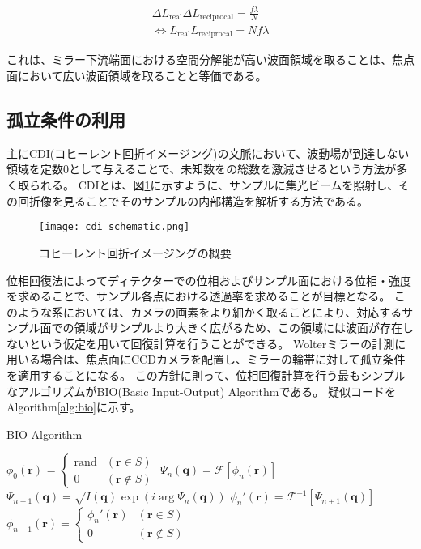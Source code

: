 \begin{eqnarray}
  \Delta L_{\mathrm{real}} \Delta L_{\mathrm{reciprocal}} = \frac{f  \lambda}{N} \label{eqn:sampling_theorem_px} \\
  \Leftrightarrow 
  L_{\mathrm{real}} L_{\mathrm{reciprocal}} = N f \lambda \label{eqn:sampling_theorem_size}
\end{eqnarray}

これは、ミラー下流端面における空間分解能が高い波面領域を取ることは、焦点面において広い波面領域を取ることと等価である。

\clearpage
\newpage

\subsection{孤立条件の利用}
\label{chap3_solitude_introduction}
主にCDI(コヒーレント回折イメージング)の文脈において、波動場が到達しない領域を定数0として与えることで、未知数をの総数を激減させるという方法が多く取られる。
CDIとは、図\ref{fig:cdi_schematic}に示すように、サンプルに集光ビームを照射し、その回折像を見ることでそのサンプルの内部構造を解析する方法である。

\begin{figure}[!ht]
\centering
\texttt{[image: cdi\_schematic.png]}
\caption{コヒーレント回折イメージングの概要}
\label{fig:cdi_schematic}
\end{figure}

位相回復法によってディテクターでの位相およびサンプル面における位相・強度を求めることで、サンプル各点における透過率を求めることが目標となる。
このような系においては、カメラの画素をより細かく取ることにより、対応するサンプル面での領域がサンプルより大きく広がるため、この領域には波面が存在しないという仮定を用いて回復計算を行うことができる。
Wolterミラーの計測に用いる場合は、焦点面にCCDカメラを配置し、ミラーの輪帯に対して孤立条件を適用することになる。
この方針に則って、位相回復計算を行う最もシンプルなアルゴリズムがBIO(Basic Input-Output) Algorithmである。
疑似コードをAlgorithm\ref{alg:bio}に示す。

\newcommand{\pos} {
    \mathbf{r}
}
\newcommand{\rpos} {
    \mathbf{q}
}

\begin{algorithm}                      
\caption{BIO Algorithm}         
\label{alg:bio}                          
\begin{algorithmic}
    \STATE $\phi_0(\pos)$
      = $\begin{cases}
        \mathrm{rand} & (\pos \in S) \\
        0 & (\pos \notin S)
      \end{cases}$
    \STATE $\Psi_n(\rpos) = \mathcal F [\phi_n(\pos)]$
    \STATE $\Psi_{n+1}(\rpos) = \sqrt{I(\rpos)} \exp \left( i \arg \Psi_n(\rpos) \right)$ 
    \STATE $\phi_n'(\pos) = \mathcal F^{-1} [\Psi_{n+1}(\rpos)]$
    \STATE $\phi_{n+1}(\pos)
      = \begin{cases}
          \phi_n'(\pos) & (\pos \in S) \\
          0 & (\pos \notin S)
      \end{cases}$
    \ENDFOR
\end{algorithmic}
\end{algorithm}

